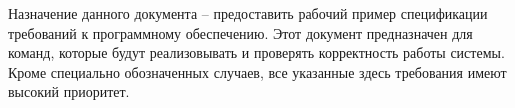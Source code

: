 Назначение данного документа -- предоставить рабочий пример спецификации требований к программному обеспечению.
Этот документ предназначен для команд, которые будут реализовывать и проверять корректность работы системы. 
Кроме специально обозначенных случаев, все указанные здесь требования имеют высокий приоритет.
